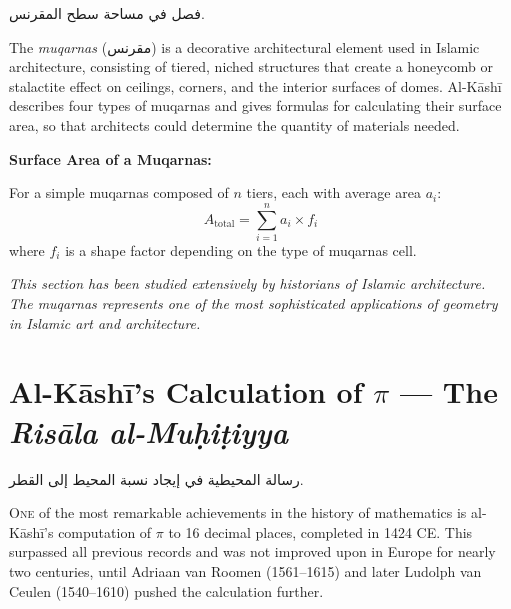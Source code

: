 \documentclass[11pt,a4paper]{article}
\newenvironment{arabicbox}{%
  \begin{framed}
  \begin{minipage}{\linewidth-2\fboxsep-2\fboxrule}
  \setlength{\parindent}{0pt}
  \linespread{1.3}\selectfont
}{%
  \end{minipage}
  \end{framed}
}
\newenvironment{mathalgo}{%
  \par\vspace{0.3cm}
  \begin{framed}
  \setlength{\parindent}{0pt}
}{%
  \end{framed}
  \par\vspace{0.3cm}
}
\newcommand{\cnote}[1]{\textcolor{notecolor}{\textit{#1}}}
\newcommand{\ar}[1]{{\arabicfont\beginR #1\endR}}
\begin{document}
\begin{arabicbox}
\begin{Arabic}
فصل في مساحة سطح المقرنس.
\end{Arabic}
\end{arabicbox}

\vspace{0.3cm}

The \textit{muqarnas} (\ar{مقرنس}) is a decorative architectural
element used in Islamic architecture, consisting of tiered, niched
structures that create a honeycomb or stalactite effect on ceilings,
corners, and the interior surfaces of domes. Al-K\=ash\=i describes four
types of muqarnas and gives formulas for calculating their surface area,
so that architects could determine the quantity of materials needed.

\begin{mathalgo}
\textbf{Surface Area of a Muqarnas:}

For a simple muqarnas composed of $n$ tiers, each with average area
$a_i$:
\[
A_{\text{total}} = \sum_{i=1}^{n} a_i \times f_i
\]
where $f_i$ is a shape factor depending on the type of muqarnas cell.
\end{mathalgo}

\cnote{This section has been studied extensively by historians of
Islamic architecture. The muqarnas represents one of the most
sophisticated applications of geometry in Islamic art and architecture.}
\clearpage

\section{Al-K\=ash\=i's Calculation of $\pi$ --- The \textit{Ris\=ala al-Mu\d{h}i\d{t}iyya}}
\label{sec:picalc}

\begin{arabicbox}
\begin{Arabic}
رسالة المحيطية في إيجاد نسبة المحيط إلى القطر.
\end{Arabic}
\end{arabicbox}

\vspace{0.3cm}

\lettrine[lines=3, nindent=0em, findent=3pt]{\color{chapcolor}O}{ne}
of the most remarkable achievements in the history of mathematics is
al-K\=ash\=i's computation of $\pi$ to 16 decimal places, completed in 1424
CE. This surpassed all previous records and was not improved upon in
Europe for nearly two centuries, until Adriaan van Roomen (1561--1615)
and later Ludolph van Ceulen (1540--1610) pushed the calculation
further.
\end{document}
